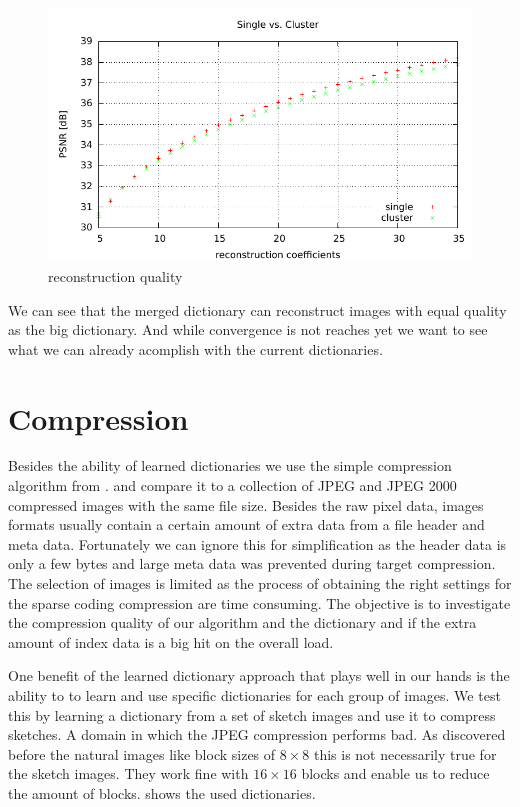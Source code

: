 \begin{figure}[H]
\centering
\includegraphics[width = 1.0\textwidth]{../tests/results/coeffsConvergInc.pdf}
\caption{reconstruction quality}
\label{fig:coeffsConvergInc}
\end{figure}

We can see that the merged dictionary can reconstruct images with equal quality
as the big dictionary. And while convergence is not reaches yet we want to see
what we can already acomplish with the current dictionaries.


\clearpage
\section{Compression}
Besides the ability of learned dictionaries 
we use the simple compression algorithm from .
and compare it to a collection of JPEG and JPEG 2000 compressed images with the
same file size. Besides the raw pixel data, images formats usually contain a
certain amount of extra data from a file header and meta data. Fortunately we
can ignore this for simplification as the header data is only a few bytes and
large meta data was prevented during target compression. The selection of
images is limited as the process of obtaining the right settings for the sparse
coding compression are time consuming.
The objective is to investigate the compression quality of our algorithm and
the dictionary and if the extra amount of index data is a big hit on the overall
load.

One benefit of the learned dictionary approach that plays well in our
hands is the ability to to learn and use specific dictionaries for each group of
images. We test this by learning a dictionary from a set of sketch images and
use it to compress sketches. A domain in which the JPEG compression performs
bad. As discovered before the natural images like block sizes of $8\times 8$
this is not necessarily true for the sketch images. They work fine with
$16\times 16$ blocks and enable us to reduce the amount of blocks.
 shows the used dictionaries. 

